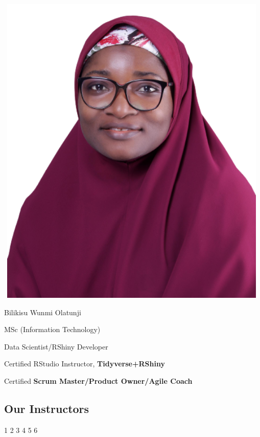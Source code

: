 \documentclass[
  letterpaper,
  DIV=11,
  numbers=noendperiod]{scrartcl}
\begin{document}
\includegraphics[width=5.19792in,height=5.97917in]{images/profile-pix.png}

Bilikisu Wunmi Olatunji

MSc (Information Technology)

Data Scientist/RShiny Developer

Certified RStudio Instructor, {\textbf{Tidyverse+RShiny}}

Certified {\textbf{Scrum Master/Product Owner/Agile Coach}}

\hypertarget{our-instructors-1}{%
\subsection{Our Instructors}\label{our-instructors-1}}

{1} 2 {3 4 5 6}
\end{document}
